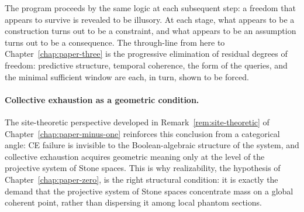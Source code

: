 The program proceeds by the same logic at each subsequent step: a freedom that appears
to survive is revealed to be illusory.  At each stage, what appears to be a construction
turns out to be a constraint, and what appears to be an assumption turns out to be a
consequence.  The through-line from here to Chapter~\ref{chap:paper-three} is the
progressive elimination of residual degrees of freedom: predictive structure, temporal
coherence, the form of the queries, and the minimal sufficient window are each, in turn,
shown to be forced.

\paragraph{Collective exhaustion as a geometric condition.}
The site-theoretic perspective developed in
Remark~\ref{rem:site-theoretic} of Chapter~\ref{chap:paper-minus-one}
reinforces this conclusion from a categorical angle: CE failure is
invisible to the Boolean-algebraic structure of the system, and
collective exhaustion acquires geometric meaning only at the level of
the projective system of Stone spaces.  This is why realizability,
the hypothesis of Chapter~\ref{chap:paper-zero}, is the right
structural condition: it is exactly the demand that the projective
system of Stone spaces concentrate mass on a global coherent point,
rather than dispersing it among local phantom sections.

